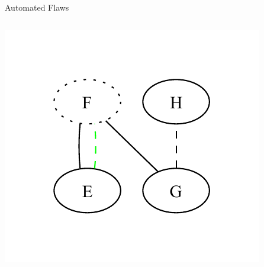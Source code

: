 \begin{frame}{Automated Flaws}
\begin{columns}[c]
\begin{column}{.5\linewidth}
            \includegraphics[width=\textwidth]{assets/graphs/SynExampleGlossaryGraph.pdf}
        \end{column}
    \end{columns} %
    \vspace{-0.25cm}
\end{frame}

